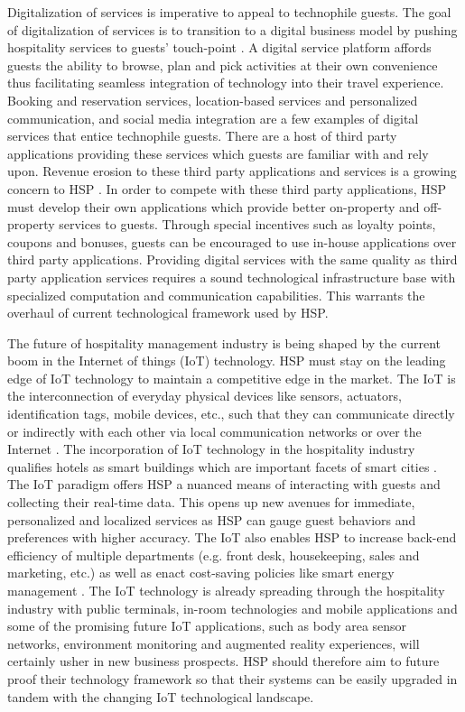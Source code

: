 \documentclass[10pt,journal,letterpaper]{IEEEtran}
\begin{document}
{Digitalization of services is imperative to appeal to technophile guests. The goal of digitalization of services is to transition to a digital business model by pushing hospitality services to guests' touch-point \cite{Kasavana_HospitalityIndustry_2014}. %
A digital service platform affords guests the ability to browse, plan and pick activities at their own convenience thus facilitating seamless integration of technology into their travel experience. Booking and reservation services, location-based services and personalized communication, and social media integration are a few examples of digital services that entice technophile guests. There are a host of third party applications providing these services which guests are familiar with and rely upon. Revenue erosion to these third party applications and services is a growing concern to HSP \cite{Tossell_DigitalGuestStrategy_2015}. In order to compete with these third party applications, HSP must develop their own applications which provide better on-property and off-property services to guests. Through special incentives such as loyalty points, coupons and bonuses, guests can be encouraged to use in-house applications over third party applications. Providing digital services with the same quality as third party application services requires a sound technological infrastructure base with specialized computation and communication capabilities. This warrants the overhaul of current technological framework used by HSP.

The future of hospitality management industry is being shaped by the current boom in the Internet of things (IoT) technology. HSP must stay on the leading edge of IoT technology to maintain a competitive edge in the market. The IoT is the interconnection of everyday physical devices like sensors, actuators, identification tags, mobile devices, etc., such that they can communicate directly or indirectly with each other via local communication networks or over the Internet \cite{Munir_IFCIoT_2017}. The incorporation of IoT technology in the hospitality industry qualifies hotels as smart buildings which are important facets of smart cities \cite{Mohanty_SmartCities_2016}. The IoT paradigm offers HSP a nuanced means of interacting with guests and collecting their real-time data. This opens up new avenues for immediate, personalized and localized services as HSP can gauge guest behaviors and preferences with higher accuracy. The IoT also enables HSP to increase back-end efficiency of multiple departments \cite{Intelity_ForecastHotelTech_2016} (e.g. front desk, housekeeping, sales and marketing, etc.) as well as enact cost-saving policies like smart energy management \cite{Lee_Energy_2018} \cite{Hsiao_Energy_2018}. The IoT technology is already spreading through the hospitality industry with public terminals, in-room technologies and mobile applications \cite{Kasavana_HospitalityIndustry_2014} and some of the promising future IoT applications, such as body area sensor networks, environment monitoring and augmented reality experiences, will certainly usher in new business prospects. HSP should therefore aim to future proof their technology framework so that their systems can be easily upgraded in tandem with the changing IoT technological landscape.

}
\end{document}
